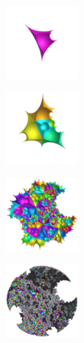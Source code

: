 \begin{figure}[H]
 \begin{minipage}[t]{0.19\textwidth}
  \centering
  \includegraphics[width=1.1in, height=1.1in, keepaspectratio]{./img/application/sphairahedron/finiteProcess/step1.png}
  \label{fig:sphaira-step1}
 \end{minipage}
 \hspace*{\fill}
 \begin{minipage}[t]{0.19\textwidth}
  \centering
  \includegraphics[width=1.1in, height=1.1in, keepaspectratio]{./img/application/sphairahedron/finiteProcess/step2.png}
  \label{fig:sphaira-step2}
 \end{minipage}
 \hspace*{\fill}
 \begin{minipage}[t]{0.19\textwidth}
  \centering
  \includegraphics[width=1.1in, height=1.1in, keepaspectratio]{./img/application/sphairahedron/finiteProcess/step5.png}
  \label{fig:sphaira-step5}
 \end{minipage}
 \hspace*{\fill}
 \begin{minipage}[t]{0.19\textwidth}
  \centering
  \includegraphics[width=1.1in, height=1.1in, keepaspectratio]{./img/application/sphairahedron/finiteProcess/step10.png}

\end{minipage}
\end{figure}
